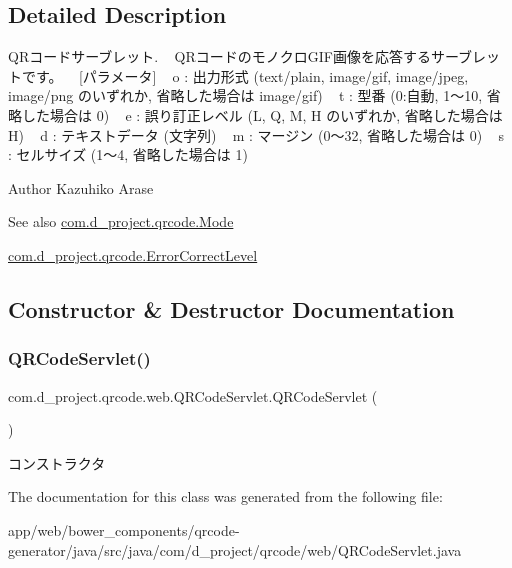 \subsection{Detailed Description}
Q\+Rコードサーブレット. ~\newline
Q\+Rコードのモノクロ\+G\+I\+F画像を応答するサーブレットです。 ~\newline
\mbox{[}パラメータ\mbox{]} ~\newline
 o \+: 出力形式 (text/plain, image/gif, image/jpeg, image/png のいずれか, 省略した場合は image/gif) ~\newline
 t \+: 型番 (0\+:自動, 1～10, 省略した場合は 0) ~\newline
 e \+: 誤り訂正レベル (L, Q, M, H のいずれか, 省略した場合は H) ~\newline
 d \+: テキストデータ (文字列) ~\newline
 m \+: マージン (0～32, 省略した場合は 0) ~\newline
 s \+: セルサイズ (1～4, 省略した場合は 1) \begin{DoxyAuthor}{Author}
Kazuhiko Arase 
\end{DoxyAuthor}
\begin{DoxySeeAlso}{See also}
\hyperlink{interfacecom_1_1d__project_1_1qrcode_1_1_mode}{com.\+d\+\_\+project.\+qrcode.\+Mode} 

\hyperlink{interfacecom_1_1d__project_1_1qrcode_1_1_error_correct_level}{com.\+d\+\_\+project.\+qrcode.\+Error\+Correct\+Level} 
\end{DoxySeeAlso}


\subsection{Constructor \& Destructor Documentation}
\mbox{\label{classcom_1_1d__project_1_1qrcode_1_1web_1_1_q_r_code_servlet_a564a560bec02b1ed4d4a4cf44da20210}} 
\subsubsection{\texorpdfstring{Q\+R\+Code\+Servlet()}{QRCodeServlet()}}
{\footnotesize\ttfamily com.\+d\+\_\+project.\+qrcode.\+web.\+Q\+R\+Code\+Servlet.\+Q\+R\+Code\+Servlet (\begin{DoxyParamCaption}{ }\end{DoxyParamCaption})\hspace{0.3cm}{\ttfamily [inline]}}

コンストラクタ 

The documentation for this class was generated from the following file\+:\begin{DoxyCompactItemize}
\item 
app/web/bower\+\_\+components/qrcode-\/generator/java/src/java/com/d\+\_\+project/qrcode/web/Q\+R\+Code\+Servlet.\+java\end{DoxyCompactItemize}
